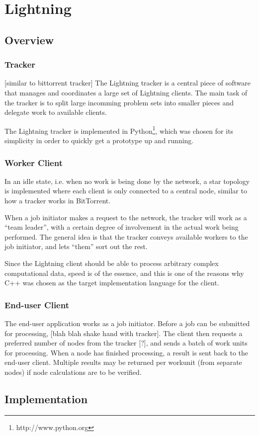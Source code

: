 \chapter{Lightning}
\section{Overview}
\subsection{Tracker}
[similar to bittorrent tracker]
The Lightning tracker is a central piece of software that manages and coordinates a large set
of Lightning clients. The main task of the tracker is to split large incomming problem sets into smaller pieces and delegate work to available clients.

The Lightning tracker is implemented in Python\footnote{http://www.python.org}, which was chosen for its simplicity in order to quickly get a prototype up and running.

\subsection{Worker Client}
In an idle state, i.e. when no work is being done by the network, a star topology is implemented where each client is only connected to a central node, similar to how a tracker works in BitTorrent.

When a job initiator makes a request to the network, the tracker will work as a “team leader”,  with a certain degree of involvement in the actual work being performed. The general idea is that the tracker conveys available workers to the job initiator, and lets “them” sort out the rest.


Since the Lightning client should be able to process arbitrary complex computational data, speed is of the essence, and this is one of the reasons why C++ was chosen as the target implementation language for the client.

\subsection{End-user Client}
The end-user application works as a job initiator. Before a job can be submitted for processing, [blah blah shake hand with tracker]. The client then requests a preferred number of nodes from the tracker [?], and sends a batch of work units for processing. When a node has finished processing, a result is sent back to the end-user client. Multiple results may be returned per workunit (from separate nodes) if node calculations are to be verified.

\section{Implementation}